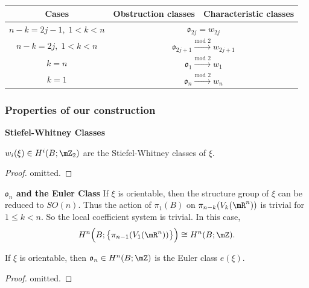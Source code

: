 \begin{center}
\begin{table}[htbp]
\begin{tabular}{|c|cc|}
\hline
Cases              & \multicolumn{1}{c|}{Obstruction classes}       & Characteristic classes       \\ \hline
$n-k=2j-1,\;1<k<n$ & \multicolumn{2}{c|}{$\mathfrak{o}_{2j}=w_{2j}$}                               \\ \hline
$n-k=2j,\;1<k<n$   & \multicolumn{2}{c|}{$\mathfrak{o}_{2j+1}\xrightarrow{\text{mod } 2}w_{2j+1}$} \\ \hline
$k=n$              & \multicolumn{2}{c|}{$\mathfrak{o}_{1}\xrightarrow{\text{mod } 2}w_{1}$}       \\ \hline
$k=1$              & \multicolumn{2}{c|}{$\mathfrak{o}_{n}\xrightarrow{\text{mod } 2}w_{n}$}       \\ \hline
\end{tabular}
\end{table}
\end{center}

\subsubsection*{Properties of our construction}
\noindent\textbf{Stiefel-Whitney Classes}
\begin{theorem}
    $w_i(\xi)\in H^i(B;\mZ_2)$ are the Stiefel-Whitney classes of $\xi$.
\end{theorem}
\begin{proof}
    omitted.
\end{proof}

\noindent\textbf{$\mathfrak{o}_n$ and the Euler Class}
If $\xi$ is orientable, then the structure group of $\xi$ can be 
reduced to $SO(n)$. Thus the action of $\pi_1(B)$ on 
$\pi_{n-k}(V_k(\mR^n))$ is trivial for $1\leq k<n$. So the local 
coefficient system is trivial. In this case, 
\begin{equation*}
    H^n\Big(B;\big\{\pi_{n-1}(V_1(\mR^n))\big\}\Big) 
    \cong H^n(B;\mZ).
\end{equation*}
\begin{theorem}
    If $\xi$ is orientable, then $\mathfrak{o}_n\in H^n(B;\mZ)$ 
    is the Euler class $e(\xi)$.
\end{theorem}
\begin{proof}
    omitted.
\end{proof}

